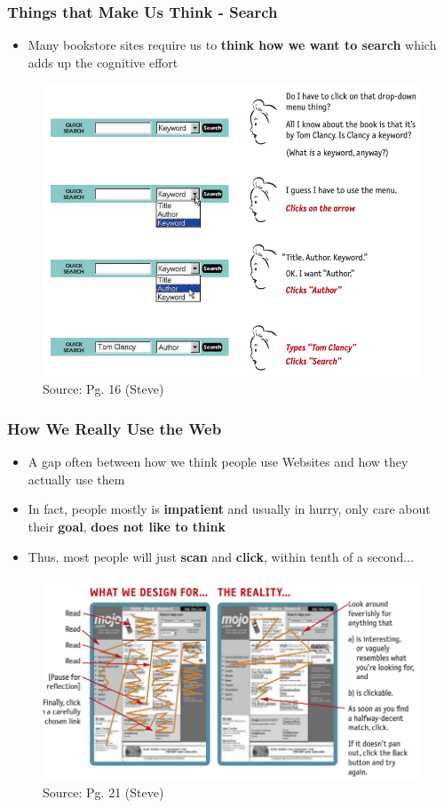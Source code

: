 \documentclass{beamer}
\begin{document}
\begin{frame}
	\frametitle{Things that Make Us Think - Search}
	\begin{itemize}
		\item Many bookstore sites require us to \textbf{think how we want to search} which adds up the cognitive effort 
	\end{itemize}
	\centering
	\begin{figure}
		\includegraphics[width=0.5\linewidth]{steve/search}
		\caption{Source: Pg. 16 (Steve)}
	\end{figure}
\end{frame}

\begin{frame}
	\frametitle{How We Really Use the Web}
	\begin{itemize}
		\item A gap often between how we think people use Websites and how they actually use them
		\item In fact, people mostly is \textbf{impatient} and usually in hurry, only care about their \textbf{goal}, \textbf{does not like to think}
		\item Thus, most people will just \textbf{scan} and \textbf{click}, within tenth of a second...
	\end{itemize}
		\begin{figure}
		\includegraphics[width=0.5\linewidth]{steve/how}
		\caption{Source: Pg. 21 (Steve)}
	\end{figure}
\end{frame}
\end{document}
